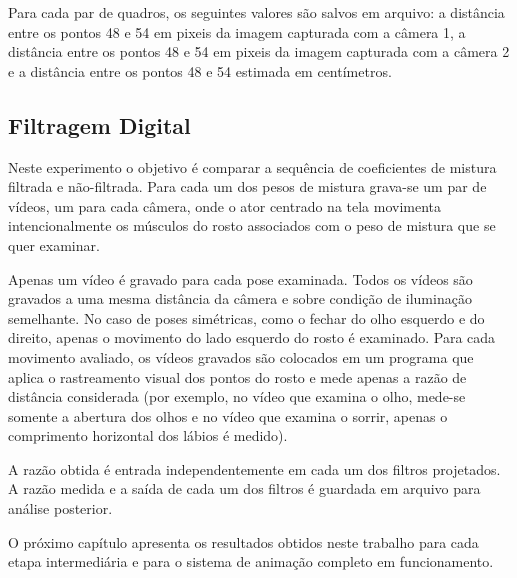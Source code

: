 Para cada par de quadros, os seguintes valores são salvos em arquivo: a
distância entre os pontos 48 e 54 em pixeis da imagem capturada com a câmera 1,
a distância entre os pontos 48 e 54 em pixeis da imagem capturada com a câmera 2
e a distância entre os pontos 48 e 54 estimada em centímetros. 


\subsection{Filtragem Digital}

Neste experimento o objetivo é comparar a sequência de coeficientes de mistura
filtrada e não-filtrada.  Para cada um dos pesos de mistura grava-se um par de
vídeos, um para cada câmera, onde o ator centrado na tela movimenta
intencionalmente os músculos do rosto associados com o peso de mistura que se
quer examinar. 

Apenas um vídeo é gravado para cada pose examinada. Todos os vídeos são gravados
a uma mesma distância da câmera e sobre condição de iluminação semelhante. No
caso de poses simétricas, como o fechar do olho esquerdo e do direito, apenas o
movimento do lado esquerdo do rosto é examinado. Para cada movimento avaliado,
os vídeos gravados são colocados em um programa que aplica o rastreamento visual
dos pontos do rosto e mede apenas a razão de distância considerada (por exemplo,
no vídeo que examina o olho, mede-se somente a abertura dos olhos e no vídeo que
examina o sorrir, apenas o comprimento horizontal dos lábios é medido). 

A razão obtida é entrada independentemente em cada um dos filtros projetados. A
razão medida e a saída de cada um dos filtros é guardada em arquivo para análise
posterior.

O próximo capítulo apresenta os resultados obtidos neste trabalho para cada etapa 
intermediária e para o sistema de animação completo em funcionamento.


